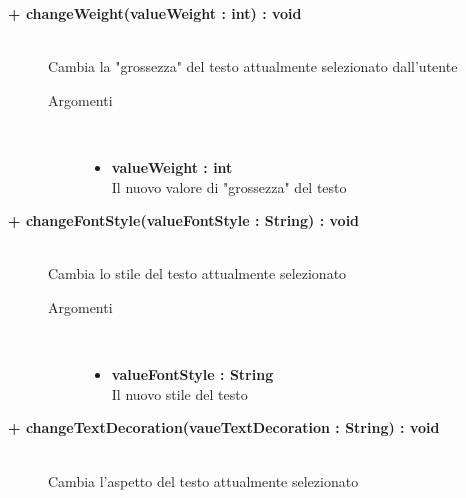 \begin{description}
\begin{description}
\begin{description}
		\end{description}
	\end{description}
	
	\begin{description}
		\item[\textbf{\color{blue}+ changeWeight(valueWeight : int) : void	 	}] \hfill \\
			Cambia la "grossezza" del testo attualmente selezionato dall'utente
			
		\begin{description}
			\item[Argomenti] \hfill \\
				\begin{itemize}
				
					\item \textbf{valueWeight : int	} \hfill \\
					Il nuovo valore di "grossezza" del testo
				\end{itemize}
				
		\end{description}
	\end{description}
	
	\begin{description}
		\item[\textbf{\color{blue}+ changeFontStyle(valueFontStyle : String) : void	 	}] \hfill \\
		Cambia lo stile del testo attualmente selezionato
			
		\begin{description}
			\item[Argomenti] \hfill \\
				\begin{itemize}
				
					\item \textbf{valueFontStyle : String} \hfill \\
					Il nuovo stile del testo
				\end{itemize}
				
		\end{description}
	\end{description}
	
	\begin{description}
		\item[\textbf{\color{blue}+ changeTextDecoration(vaueTextDecoration : String) : void	 	}] \hfill \\
		Cambia l'aspetto del testo attualmente selezionato
			

\end{description}
\end{description}
